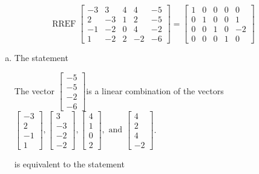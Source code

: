\begin{exerciseAnswer} 
\[\operatorname{RREF}  \left[\begin{array}{cccc|c}
-3 & 3 & 4 & 4 & -5 \\
2 & -3 & 1 & 2 & -5 \\
-1 & -2 & 0 & 4 & -2 \\
1 & -2 & 2 & -2 & -6
\end{array}\right] = \left[\begin{array}{cccc|c}
1 & 0 & 0 & 0 & 0 \\
0 & 1 & 0 & 0 & 1 \\
0 & 0 & 1 & 0 & -2 \\
0 & 0 & 0 & 1 & 0
\end{array}\right] \]
\begin{enumerate}[(a)]
\item  The statement 
\begin{center}\begin{minipage}{0.8\textwidth}
 The vector \( \left[\begin{array}{c}
-5 \\
-5 \\
-2 \\
-6
\end{array}\right] \)is a linear combination of the vectors \( \left[\begin{array}{c}
-3 \\
2 \\
-1 \\
1
\end{array}\right] , \left[\begin{array}{c}
3 \\
-3 \\
-2 \\
-2
\end{array}\right] , \left[\begin{array}{c}
4 \\
1 \\
0 \\
2
\end{array}\right] , \text{ and } \left[\begin{array}{c}
4 \\
2 \\
4 \\
-2
\end{array}\right] \). 
\end{minipage}\end{center}
     is equivalent to the statement 
\begin{center}\begin{minipage}{0.8\textwidth}

\end{minipage}
\end{center}
\end{enumerate}
\end{exerciseAnswer}
